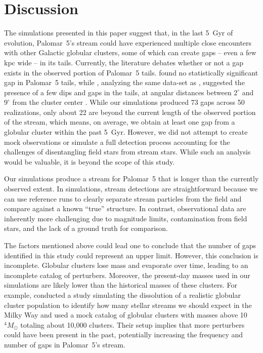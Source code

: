 \documentclass{aa}
\begin{document}
  
  
\section{Discussion}
  
  The simulations presented in this paper suggest that, in the last 5~Gyr of evolution, Palomar~5's stream could have experienced multiple close encounters with other Galactic globular clusters, some of which can create gaps -- even a few kpc wide -- in its tails. Currently, the literature debates whether or not a gap exists in the observed portion of Palomar~5 tails. \citet{2016ApJ...819....1I} found no statistically significant gap in Palomar~5 tails, while \citet{2017MNRAS.470...60E}, analyzing the same data-set as \citet{2016ApJ...819....1I}, suggested the presence of a few dips and gaps in the tails, at angular distances between $2^\circ$ and $9^\circ$ from the cluster center \citep[see also][]{ 2020ApJ...889...70B}. While our simulations produced 73 gaps across 50 realizations, only about 22 are beyond the current length of the observed portion of the stream, which means, on average, we obtain at least one gap from a globular cluster within the past 5~Gyr. However, we did not attempt to create mock observations or simulate a full detection process accounting for the challenges of disentangling field stars from stream stars. While such an analysis would be valuable, it is beyond the scope of this study.

  
  Our simulations produce a stream for Palomar~5 that is longer than the currently observed extent. In simulations, stream detections are straightforward because we can use reference runs to clearly separate stream particles from the field and compare against a known ``true'' structure. In contrast, observational data are inherently more challenging due to magnitude limits, contamination from field stars, and the lack of a ground truth for comparison. 
  
  The factors mentioned above could lead one to conclude that the number of gaps identified in this study could represent an upper limit. However, this conclusion is incomplete. Globular clusters lose mass and evaporate over time, leading to an incomplete catalog of perturbers. Moreover, the present-day masses used in our simulations are likely lower than the historical masses of these clusters. For example, \citet{2024ApJ...976...54P} conducted a study simulating the dissolution of a realistic globular cluster population to identify how many stellar streams we should expect in the Milky Way and used a mock catalog of globular clusters with masses above 10$^4 M_\odot$ totaling about 10,000 clusters. Their setup implies that more perturbers could have been present in the past, potentially increasing the frequency and number of gaps in Palomar~5's stream.
  
\end{document}
